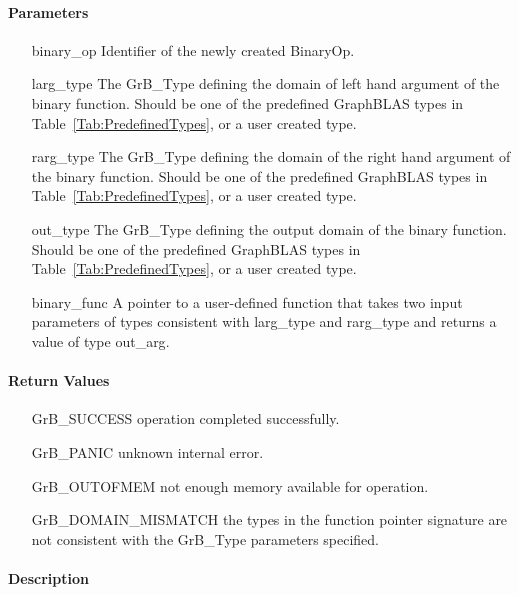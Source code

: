 \paragraph{Parameters}

\begin{itemize}[leftmargin=1.1in]
    \item[{\sf binary\_op}]      Identifier of the newly created BinaryOp.
    \item[{\sf larg\_type}]      The {\sf GrB\_Type} defining the domain of left hand argument of
    the binary function. Should be one of the predefined
    GraphBLAS types in Table~\ref{Tab:PredefinedTypes}, or a user created type.
    \item[{\sf rarg\_type}]      The {\sf GrB\_Type} defining the domain of the right hand 
    argument of the binary function. Should be one of the predefined
    GraphBLAS types in Table~\ref{Tab:PredefinedTypes}, or a user created type.
    \item[{\sf out\_type}]       The {\sf GrB\_Type} defining the output domain of the binary
    function. Should be one of the predefined
    GraphBLAS types in Table~\ref{Tab:PredefinedTypes}, or a user created type.
    \item[{\sf binary\_func}]    A pointer to a user-defined function that takes two input 
    parameters of types consistent with {\sf larg\_type} and {\sf rarg\_type} and returns a 
    value of type {\sf out\_arg}.
\end{itemize}


\paragraph{Return Values}

\begin{itemize}[leftmargin=2.1in]
\item[{\sf GrB\_SUCCESS}]           operation completed successfully.
\item[{\sf GrB\_PANIC}]             unknown internal error.
\item[{\sf GrB\_OUTOFMEM}]          not enough memory available for operation.
\item[{\sf GrB\_DOMAIN\_MISMATCH}]  the types in the function pointer signature are not   
                                    consistent with the {\sf GrB\_Type} parameters specified.
\end{itemize}

\paragraph{Description}

